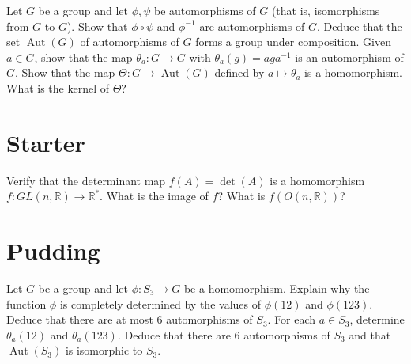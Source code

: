 \documentclass[answers]{exam}
\begin{document}
\begin{questions}
\question%
\begin{subparts}
\subpart Let $G$ be a group and let $\phi, \psi$ be automorphisms of $G$ (that is, isomorphisms from $G$ to $G$). Show that $\phi \circ \psi$ and $\phi^{-1}$ are automorphisms of $G$. Deduce that the set $\operatorname{Aut}(G)$ of automorphisms of $G$ forms a group under composition.
\subpart Given $a \in G$, show that the map $\theta_{a}: G \rightarrow G$ with $\theta_{a}(g)=a g a^{-1}$ is an automorphism of $G$.
\subpart Show that the map $\Theta: G \rightarrow \operatorname{Aut}(G)$ defined by $a \mapsto \theta_{a}$ is a homomorphism. What is the kernel of $\Theta$?
\end{subparts}

\end{questions}

\section*{Starter}
\begin{questions}
\question%
Verify that the determinant map $f(A)=\operatorname{det}(A)$ is a homomorphism $f: G L(n, \mathbb{R}) \rightarrow \mathbb{R}^{*}$. What is the image of $f$? What is $f(O(n, \mathbb{R}))$?

\end{questions}

\section*{Pudding}
\begin{questions}
\question%
\begin{subparts}
\subpart Let $G$ be a group and let $\phi: S_{3} \rightarrow G$ be a homomorphism. Explain why the function $\phi$ is completely determined by the values of $\phi(12)$ and $\phi(123)$.
\subpart Deduce that there are at most 6 automorphisms of $S_{3}$.
\subpart For each $a \in S_{3}$, determine $\theta_{a}(12)$ and $\theta_{a}(123)$.
\subpart Deduce that there are 6 automorphisms of $S_{3}$ and that $\operatorname{Aut}\left(S_{3}\right)$ is isomorphic to $S_{3}$.
\end{subparts}

\end{questions}
\end{document}
